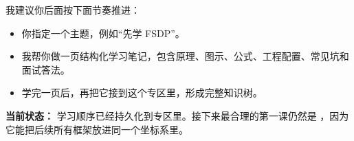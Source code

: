 我建议你后面按下面节奏推进：
\begin{itemize}[leftmargin=1.5em]
  \item 你指定一个主题，例如“先学 FSDP”。
  \item 我帮你做一页结构化学习笔记，包含原理、图示、公式、工程配置、常见坑和面试答法。
  \item 学完一页后，再把它接到这个专区里，形成完整知识树。
\end{itemize}

\begin{summarybox}
\textbf{当前状态：} 学习顺序已经持久化到专区里。接下来最合理的第一课仍然是 ，因为它能把后续所有框架放进同一个坐标系里。
\end{summarybox}
